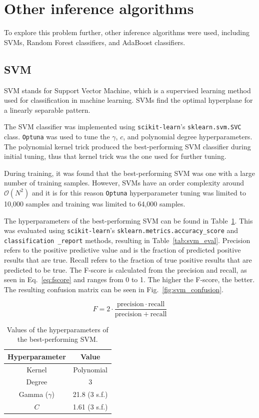 \documentclass[11pt,a4paper]{article}
\begin{document}
\clearpage
\section{Other inference algorithms}
To explore this problem further, other inference algorithms were used, including SVMs, Random Forest classifiers, and AdaBoost classifiers.
\subsection{SVM}
SVM stands for Support Vector Machine, which is a supervised learning method used for classification in machine learning. SVMs find the optimal hyperplane for a linearly separable pattern.

The SVM classifier was implemented using \texttt{scikit-learn}'s \texttt{sklearn.svm.SVC} class. \texttt{Optuna} was used to tune the $\gamma$, $c$, and polynomial degree hyperparameters. The polynomial kernel trick produced the best-performing SVM classifier during initial tuning, thus that kernel trick was the one used for further tuning.

During training, it was found that the best-performing SVM was one with a large number of training samples. However, SVMs have an order complexity around $\mathcal{O}(N^2)$ \citep{Chang2007} and it is for this reason \texttt{Optuna} hyperparameter tuning was limited to 10,000 samples and training was limited to 64,000 samples.

The hyperparameters of the best-performing SVM can be found in Table~\ref{tab:svm_hyperparameter}. This was evaluated using \texttt{scikit-learn}'s \texttt{sklearn.metrics.accuracy\_score} and \texttt{classification \_report} methods, resulting in Table~\ref{tab:svm_eval}. Precision refers to the positive predictive value and is the fraction of predicted positive results that are true. Recall refers to the fraction of true positive results that are predicted to be true. The F-score is calculated from the precision and recall, as seen in Eq.~\ref{eq:fscore} and ranges from 0 to 1. The higher the F-score, the better. The resulting confusion matrix can be seen in Fig.~\ref{fig:svm_confusion}.

\begin{equation}
    F = 2\cdot\frac{\mathrm{precision}\cdot \mathrm{recall}}{\mathrm{precision} + \mathrm{recall}}\label{eq:fscore}
\end{equation}

\begin{table}[ht]
    \centering
    \begin{tabular}{c|c}
        Hyperparameter & Value\\
        \hline
        Kernel & Polynomial \\
        Degree & 3 \\
        Gamma ($\gamma$) & 21.8 (3 s.f.) \\
        $C$ & 1.61 (3 s.f.)\\
    \end{tabular}
    \caption{Values of the hyperparameters of the best-performing SVM.}\label{tab:svm_hyperparameter}
\end{table}
\end{document}
